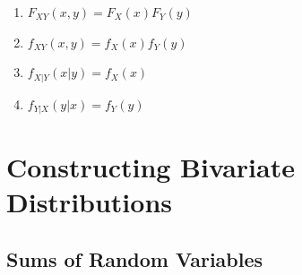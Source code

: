 \begin{multicols}{2}
\begin{enumerate}[resume*=calcrulesrv]
    \item $F _{X Y} (x, y) = F_X (x) F_Y (y)$
    \hfill \cite{statistics/book/Statistics-for-Data-Scientists/Maurits-Kaptein}

    \item $f _{X Y} (x, y) = f_X (x) f_Y (y)$
    \hfill \cite{statistics/book/Statistics-for-Data-Scientists/Maurits-Kaptein}

    \item $f _{X|Y} (x|y) = f_X (x)$
    \hfill \cite{statistics/book/Statistics-for-Data-Scientists/Maurits-Kaptein}

    \item $f _{Y|X} (y|x) = f_Y (y)$
    \hfill \cite{statistics/book/Statistics-for-Data-Scientists/Maurits-Kaptein}
\end{enumerate}
\end{multicols}











\section{Constructing Bivariate Distributions}

\subsection{Sums of Random Variables}

